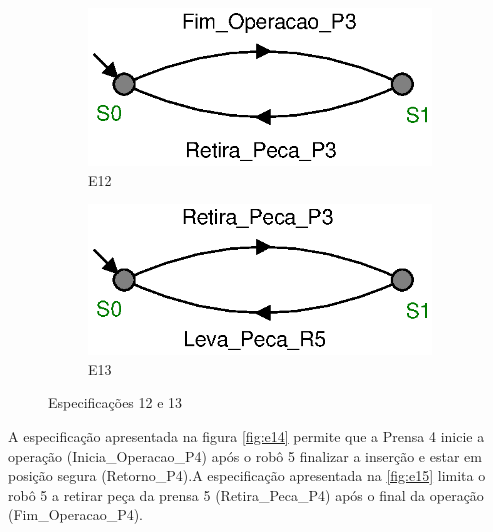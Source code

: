 \begin{figure}[H]%
  \centering
  \begin{subfigure}{0.45\textwidth}
      \centering
      \includegraphics[width=\textwidth]{imagens/E12.eps}
      \caption{E12}
      \label{fig:e12}
  \end{subfigure}
  \hfill
  \begin{subfigure}{0.45\textwidth}
      \centering
      \includegraphics[width=\textwidth]{imagens/E13.eps}
      \caption{E13}
      \label{fig:e13}
  \end{subfigure}
  \caption{Especificações 12 e 13}
  \label{fig:e1213}
\end{figure}

A especificação apresentada na figura \ref{fig:e14} permite que a Prensa 4 inicie a operação (Inicia\_Operacao\_P4) após o robô 5 finalizar a inserção e estar em posição segura (Retorno\_P4).A especificação apresentada na \ref{fig:e15} limita o robô 5 a retirar peça da prensa 5 (Retira\_Peca\_P4) após o final da operação (Fim\_Operacao\_P4).

